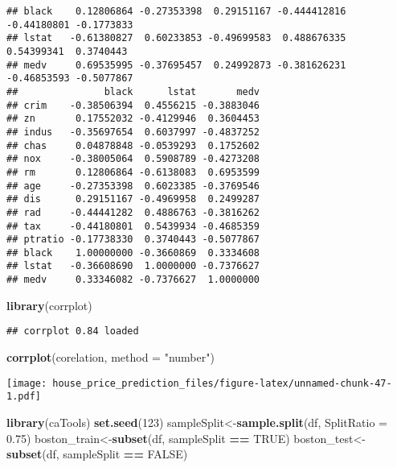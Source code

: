 \documentclass[
]{article}
\newenvironment{Shaded}{\begin{snugshade}}{\end{snugshade}}
\newcommand{\DataTypeTok}[1]{\textcolor[rgb]{0.13,0.29,0.53}{#1}}
\newcommand{\DecValTok}[1]{\textcolor[rgb]{0.00,0.00,0.81}{#1}}
\newcommand{\FloatTok}[1]{\textcolor[rgb]{0.00,0.00,0.81}{#1}}
\newcommand{\KeywordTok}[1]{\textcolor[rgb]{0.13,0.29,0.53}{\textbf{#1}}}
\newcommand{\NormalTok}[1]{#1}
\newcommand{\OperatorTok}[1]{\textcolor[rgb]{0.81,0.36,0.00}{\textbf{#1}}}
\newcommand{\OtherTok}[1]{\textcolor[rgb]{0.56,0.35,0.01}{#1}}
\newcommand{\StringTok}[1]{\textcolor[rgb]{0.31,0.60,0.02}{#1}}
\begin{document}
\begin{verbatim}
## black    0.12806864 -0.27353398  0.29151167 -0.444412816 -0.44180801 -0.1773833
## lstat   -0.61380827  0.60233853 -0.49699583  0.488676335  0.54399341  0.3740443
## medv     0.69535995 -0.37695457  0.24992873 -0.381626231 -0.46853593 -0.5077867
##               black      lstat       medv
## crim    -0.38506394  0.4556215 -0.3883046
## zn       0.17552032 -0.4129946  0.3604453
## indus   -0.35697654  0.6037997 -0.4837252
## chas     0.04878848 -0.0539293  0.1752602
## nox     -0.38005064  0.5908789 -0.4273208
## rm       0.12806864 -0.6138083  0.6953599
## age     -0.27353398  0.6023385 -0.3769546
## dis      0.29151167 -0.4969958  0.2499287
## rad     -0.44441282  0.4886763 -0.3816262
## tax     -0.44180801  0.5439934 -0.4685359
## ptratio -0.17738330  0.3740443 -0.5077867
## black    1.00000000 -0.3660869  0.3334608
## lstat   -0.36608690  1.0000000 -0.7376627
## medv     0.33346082 -0.7376627  1.0000000
\end{verbatim}

\begin{Shaded}
\begin{Highlighting}[]
\KeywordTok{library}\NormalTok{(corrplot)}
\end{Highlighting}
\end{Shaded}

\begin{verbatim}
## corrplot 0.84 loaded
\end{verbatim}

\begin{Shaded}
\begin{Highlighting}[]
\KeywordTok{corrplot}\NormalTok{(corelation, }\DataTypeTok{method =} \StringTok{"number"}\NormalTok{)}
\end{Highlighting}
\end{Shaded}

\texttt{[image: house\_price\_prediction\_files/figure-latex/unnamed-chunk-47-1.pdf]}

\begin{Shaded}
\begin{Highlighting}[]
\KeywordTok{library}\NormalTok{(caTools)}
\KeywordTok{set.seed}\NormalTok{(}\DecValTok{123}\NormalTok{)}
\NormalTok{sampleSplit<-}\KeywordTok{sample.split}\NormalTok{(df, }\DataTypeTok{SplitRatio =} \FloatTok{0.75}\NormalTok{)}
\NormalTok{boston_train<-}\KeywordTok{subset}\NormalTok{(df, sampleSplit }\OperatorTok{==}\StringTok{ }\OtherTok{TRUE}\NormalTok{)}
\NormalTok{boston_test<-}\KeywordTok{subset}\NormalTok{(df, sampleSplit }\OperatorTok{==}\StringTok{ }\OtherTok{FALSE}\NormalTok{)}
\end{Highlighting}
\end{Shaded}
\end{document}
